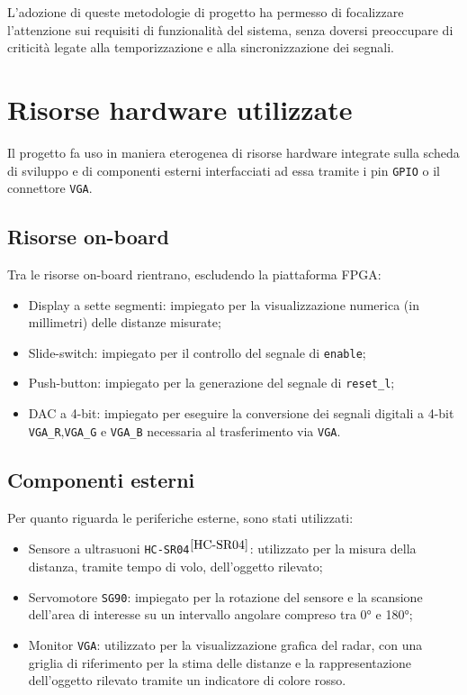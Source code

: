 \documentclass[reprint,amsmath,amssymb,aps,rmp,twoside]{revtex4-2}
\begin{document}
L'adozione di queste metodologie di progetto ha permesso di focalizzare l'attenzione sui requisiti di funzionalità del sistema, senza doversi preoccupare di criticità legate alla temporizzazione e alla sincronizzazione dei segnali.




\section{Risorse hardware utilizzate}


Il progetto fa uso in maniera eterogenea di risorse hardware integrate sulla scheda di sviluppo e di componenti esterni interfacciati ad essa tramite i pin \texttt{GPIO} o il connettore \texttt{VGA}.


\subsection{Risorse on-board}

Tra le risorse on-board rientrano, escludendo la piattaforma FPGA:

\begin{itemize}
    \item Display a sette segmenti: impiegato per la visualizzazione numerica (in millimetri) delle distanze misurate;
    \item Slide-switch: impiegato per il controllo del segnale di \texttt{enable};
    \item Push-button: impiegato per la generazione del segnale di \texttt{reset\_l};
    \item DAC a 4-bit: impiegato per eseguire la conversione dei segnali digitali a 4-bit \texttt{VGA\_R},\texttt{VGA\_G} e \texttt{VGA\_B} necessaria al trasferimento via \texttt{VGA}.
\end{itemize}

\subsection{Componenti esterni}

Per quanto riguarda le periferiche esterne, sono stati utilizzati:

\begin{itemize}
    \item Sensore a ultrasuoni \texttt{HC-SR04}$^{\cite{HC-SR04}}$: utilizzato per la misura della distanza, tramite tempo di volo, dell'oggetto rilevato;
    \item Servomotore \texttt{SG90}: impiegato per la rotazione del sensore e la scansione dell'area di interesse su un intervallo angolare compreso tra 0° e 180°;
    \item Monitor \texttt{VGA}: utilizzato per la visualizzazione grafica del radar, con una griglia di riferimento per la stima delle distanze e la rappresentazione dell'oggetto rilevato tramite un indicatore di colore rosso.
\end{itemize}
\end{document}
